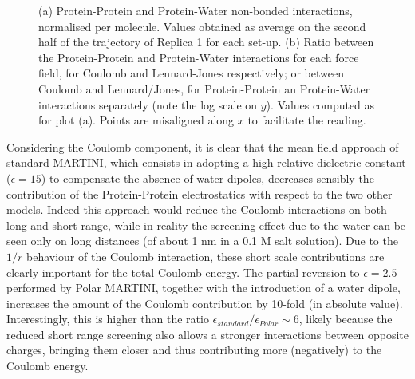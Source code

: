 \begin{figure}[p!]
\centering
{} 
\caption[Non-bonded protein energy contribution to capsule structures]{(a) Protein-Protein and Protein-Water non-bonded interactions, normalised per molecule. Values obtained as average on the second half of the trajectory of Replica 1 for each set-up. (b) Ratio between the Protein-Protein and Protein-Water interactions for each force field, for Coulomb and Lennard-Jones respectively; or between Coulomb and Lennard/Jones, for Protein-Protein an Protein-Water interactions separately (note the log scale on $y$). Values computed as for plot (a). Points are misaligned along $x$ to facilitate the reading.}
\label{fig:eng_cg}
\end{figure}

Considering the Coulomb component, it is clear that the mean field approach of standard MARTINI, which consists in adopting a high relative dielectric constant ($\epsilon = 15$) to compensate the absence of water dipoles, decreases sensibly the contribution of the Protein-Protein electrostatics with respect to the two other models.
%
Indeed this approach would reduce the Coulomb interactions on both long and short range, while in reality the screening effect due to the water can be seen only on long distances (of about 1 nm in a 0.1 M salt solution). Due to the $1/r$ behaviour of the Coulomb interaction, these short scale contributions are clearly important for the total Coulomb energy.
%
The partial reversion to $\epsilon = 2.5$ performed by Polar MARTINI, together with the introduction of a water dipole, increases the amount of the Coulomb contribution by 10-fold (in absolute value).
%
Interestingly, this is higher than the ratio $\epsilon_{standard}/\epsilon_{Polar} \sim 6$, likely because the reduced short range screening also allows a stronger interactions between opposite charges, bringing them closer and thus contributing more (negatively) to the Coulomb energy.

